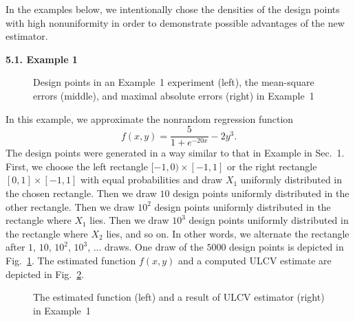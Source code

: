 \documentclass[12pt]{article}
\theoremstyle{remark}
\begin{document}
In the examples below, we intentionally chose the densities of the design points with high nonuniformity in order to demonstrate possible advantages of the new estimator.

\bigskip
\noindent\textbf{5.1. Example 1}

\begin{figure}[!h]
    \centering
    \vspace{-12pt}
    \caption{Design points in an Example~1 experiment (left), the mean-square errors (middle), and maximal absolute errors (right) in Example~1}\label{ex1mse}
\end{figure}



In this example, we approximate the nonrandom regression function
$$f(x,y)=\frac{5}{1+e^{-20x}} - 2y^3.$$
The  design points were generated in a way similar to that in Example in Sec.~1.
First, we choose the left rectangle $[-1,0)\times [-1,1]$ or the right rectangle $[0,1]\times [-1,1]$
with equal probabilities and draw $X_1$ uniformly distributed in the chosen rectangle. Then we draw $10$ design points
uniformly distributed in the other rectangle. Then we draw $10^2$ design points uniformly distributed in the rectangle where $X_1$ lies.
Then we draw $10^3$ design points uniformly distributed in the rectangle where $X_2$ lies, and so on.
In other words, we alternate the rectangle after $1$, $10$, $10^2$, $10^3$, ... draws.
One draw of the $5000$ design points is depicted in Fig.~\ref{ex1mse}. The estimated function $f(x,y)$ and a computed ULCV estimate are depicted in Fig.~\ref{ex1fun}.




%
%

\begin{figure}[!h]
    \centering
    \vspace{-12pt}
    \caption{The estimated function (left) and a result of ULCV estimator (right) in Example~1}\label{ex1fun}
\end{figure}
\end{document}
